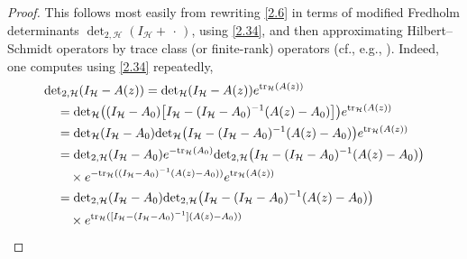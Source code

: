 \begin{proof}
This follows most easily from rewriting \eqref{2.6} in terms of modified
Fredholm determinants ${\det}_{2,{{\mathcal H}}}(I_{{\mathcal H}}+{\,\cdot\,})$, using
\eqref{2.34}, and then approximating Hilbert--Schmidt operators by trace
class (or finite-rank) operators (cf., e.g., \cite[Theorem
III.7.1]{GK69}). Indeed, one computes using \eqref{2.34} repeatedly,
\begin{align}
& {\det}_{2,{{\mathcal H}}} (I_{{\mathcal H}} - A(z)) = {\det}_{{\mathcal H}}(I_{{\mathcal H}} -
A(z))e^{{\text{\rm{tr}}}_{{\mathcal H}}(A(z))}  {\notag} \\
& \quad = {\det}_{{\mathcal H}}\big((I_{{\mathcal H}}-A_0)\big[I_{{\mathcal H}} - (I_{{\mathcal H}}-A_0)^{-1}
(A(z)-A_0)\big]\big)e^{{\text{\rm{tr}}}_{{\mathcal H}}(A(z))} {\notag} \\
& \quad =  {\det}_{{\mathcal H}}(I_{{\mathcal H}}-A_0) {\det}_{{\mathcal H}}\big(I_{{\mathcal H}} -
(I_{{\mathcal H}}-A_0)^{-1}
(A(z)-A_0)\big)e^{{\text{\rm{tr}}}_{{\mathcal H}}(A(z))} {\notag} \\
& \quad =  {\det}_{2,{{\mathcal H}}}(I_{{\mathcal H}}-A_0) e^{-{\text{\rm{tr}}}_{{\mathcal H}}(A_0)}
{\det}_{2,{{\mathcal H}}}\big(I_{{\mathcal H}} - (I_{{\mathcal H}}-A_0)^{-1}(A(z)-A_0)\big) {\notag} \\
& \qquad \times e^{-{\text{\rm{tr}}}_{{\mathcal H}}((I_{{\mathcal H}}-A_0)^{-1}(A(z)-A_0))}
e^{{\text{\rm{tr}}}_{{\mathcal H}}(A(z))}
{\notag} \\
& \quad = {\det}_{2,{{\mathcal H}}}(I_{{\mathcal H}}-A_0)
{\det}_{2,{{\mathcal H}}}\big(I_{{\mathcal H}} - (I_{{\mathcal H}}-A_0)^{-1}(A(z)-A_0)\big) {\notag} \\
& \qquad \times e^{{\text{\rm{tr}}}_{{\mathcal H}}([I_{{\mathcal H}}-(I_{{\mathcal H}}-A_0)^{-1}](A(z)-A_0))} {\notag} \\

\end{align}
\end{proof}
